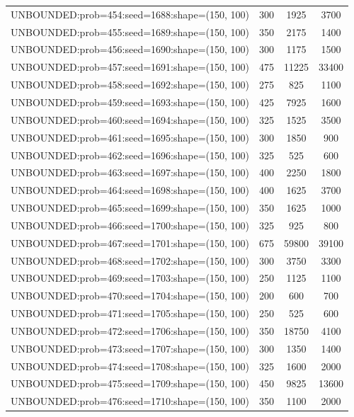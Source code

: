 \begin{longtable}{lccc}
UNBOUNDED:prob=454:seed=1688:shape=(150, 100) &      300 &  1925 &   3700 \\
UNBOUNDED:prob=455:seed=1689:shape=(150, 100) &      350 &  2175 &   1400 \\
UNBOUNDED:prob=456:seed=1690:shape=(150, 100) &      300 &  1175 &   1500 \\
UNBOUNDED:prob=457:seed=1691:shape=(150, 100) &      475 & 11225 &  33400 \\
UNBOUNDED:prob=458:seed=1692:shape=(150, 100) &      275 &   825 &   1100 \\
UNBOUNDED:prob=459:seed=1693:shape=(150, 100) &      425 &  7925 &   1600 \\
UNBOUNDED:prob=460:seed=1694:shape=(150, 100) &      325 &  1525 &   3500 \\
UNBOUNDED:prob=461:seed=1695:shape=(150, 100) &      300 &  1850 &    900 \\
UNBOUNDED:prob=462:seed=1696:shape=(150, 100) &      325 &   525 &    600 \\
UNBOUNDED:prob=463:seed=1697:shape=(150, 100) &      400 &  2250 &   1800 \\
UNBOUNDED:prob=464:seed=1698:shape=(150, 100) &      400 &  1625 &   3700 \\
UNBOUNDED:prob=465:seed=1699:shape=(150, 100) &      350 &  1625 &   1000 \\
UNBOUNDED:prob=466:seed=1700:shape=(150, 100) &      325 &   925 &    800 \\
UNBOUNDED:prob=467:seed=1701:shape=(150, 100) &      675 & 59800 &  39100 \\
UNBOUNDED:prob=468:seed=1702:shape=(150, 100) &      300 &  3750 &   3300 \\
UNBOUNDED:prob=469:seed=1703:shape=(150, 100) &      250 &  1125 &   1100 \\
UNBOUNDED:prob=470:seed=1704:shape=(150, 100) &      200 &   600 &    700 \\
UNBOUNDED:prob=471:seed=1705:shape=(150, 100) &      250 &   525 &    600 \\
UNBOUNDED:prob=472:seed=1706:shape=(150, 100) &      350 & 18750 &   4100 \\
UNBOUNDED:prob=473:seed=1707:shape=(150, 100) &      300 &  1350 &   1400 \\
UNBOUNDED:prob=474:seed=1708:shape=(150, 100) &      325 &  1600 &   2000 \\
UNBOUNDED:prob=475:seed=1709:shape=(150, 100) &      450 &  9825 &  13600 \\
UNBOUNDED:prob=476:seed=1710:shape=(150, 100) &      350 &  1100 &   2000 \\

\end{longtable}
